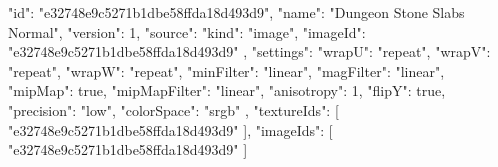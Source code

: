 {
  "id": "e32748e9c5271b1dbe58ffda18d493d9",
  "name": "Dungeon Stone Slabs Normal",
  "version": 1,
  "source": {
    "kind": "image",
    "imageId": "e32748e9c5271b1dbe58ffda18d493d9"
  },
  "settings": {
    "wrapU": "repeat",
    "wrapV": "repeat",
    "wrapW": "repeat",
    "minFilter": "linear",
    "magFilter": "linear",
    "mipMap": true,
    "mipMapFilter": "linear",
    "anisotropy": 1,
    "flipY": true,
    "precision": "low",
    "colorSpace": "srgb"
  },
  "textureIds": [
    "e32748e9c5271b1dbe58ffda18d493d9"
  ],
  "imageIds": [
    "e32748e9c5271b1dbe58ffda18d493d9"
  ]
}
